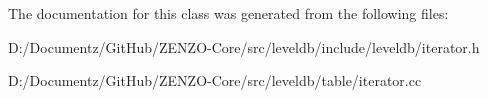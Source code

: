 The documentation for this class was generated from the following files\+:\begin{DoxyCompactItemize}
\item 
D\+:/\+Documentz/\+Git\+Hub/\+Z\+E\+N\+Z\+O-\/\+Core/src/leveldb/include/leveldb/iterator.\+h\item 
D\+:/\+Documentz/\+Git\+Hub/\+Z\+E\+N\+Z\+O-\/\+Core/src/leveldb/table/iterator.\+cc\end{DoxyCompactItemize}
